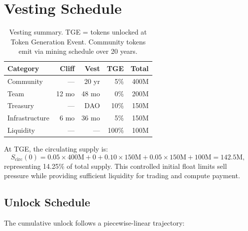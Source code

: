 \section{Vesting Schedule}

\label{sec:vesting}

\begin{table}[H]
\centering
\small
\begin{tabular}{lrrrr}
\toprule
\textbf{Category} & \textbf{Cliff} & \textbf{Vest} & \textbf{TGE} & \textbf{Total} \\
\midrule
Community & --- & 20 yr & 5\% & 400M \\
Team & 12 mo & 48 mo & 0\% & 200M \\
Treasury & --- & DAO & 10\% & 150M \\
Infrastructure & 6 mo & 36 mo & 5\% & 150M \\
Liquidity & --- & --- & 100\% & 100M \\
\bottomrule
\end{tabular}
\caption{Vesting summary. TGE = tokens unlocked at Token Generation Event. Community tokens emit via mining schedule over 20 years.}
\label{tab:vesting}
\end{table}

At TGE, the circulating supply is:
\begin{equation}
S_{\text{circ}}(0) = 0.05 \times 400\text{M} + 0 + 0.10 \times 150\text{M} +
0.05 \times 150\text{M} + 100\text{M} = 142.5\text{M},
\end{equation}
representing 14.25\% of total supply. This controlled initial float limits sell
pressure while providing sufficient liquidity for trading and compute payment.

\subsection{Unlock Schedule}

The cumulative unlock follows a piecewise-linear trajectory:

\begin{center}
\end{center}

